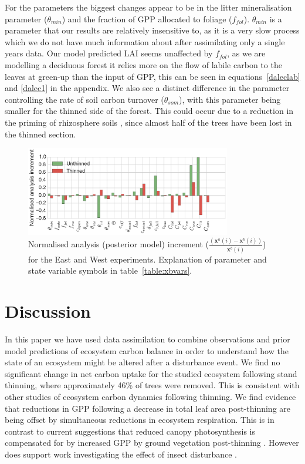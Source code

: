 \documentclass[draft,linenumbers]{agujournal}
\begin{document}
For the parameters the biggest changes appear to be in the litter mineralisation parameter (\(\theta_{min}\)) and the fraction of GPP allocated to foliage (\(f_{fol}\)). \(\theta_{min}\) is a parameter that our results are relatively insensitive to, as it is a very slow process which we do not have much information about after assimilating only a single years data. Our model predicted LAI seems unaffected by \(f_{fol}\), as we are modelling a deciduous forest it relies more on the flow of labile carbon to the leaves at green-up than the input of GPP, this can be seen in equations~\eqref{daleclab} and \eqref{dalec1} in the appendix. We also see a distinct difference in the parameter controlling the rate of soil carbon turnover (\(\theta_{som}\)), with this parameter being smaller for the thinned side of the forest. This could occur due to a reduction in the priming of rhizosphere soils \citep{ELE:ELE1095}, since almost half of the trees have been lost in the thinned section.


\begin{figure}[ht]
    \centering
    \includegraphics[width=0.8\textwidth]{xa_incc.pdf}
    \caption{Normalised analysis (posterior model) increment \big($\frac{(\textbf{x}^a(i) - \textbf{x}^b(i))}{\textbf{x}^b(i)}$\big) for the East and West experiments. Explanation of parameter and state variable symbols in table~\ref{table:xbvars}.}
    \label{fig:xa_inc}
\end{figure}

\section{Discussion}
In this paper we have used data assimilation to combine observations and prior model predictions of ecosystem carbon balance in order to understand how the state of an ecosystem might be altered after a disturbance event. We find no significant change in net carbon uptake for the studied ecosystem following stand thinning, where approximately 46\% of trees were removed. This is consistent with other studies of ecosystem carbon dynamics following thinning. We find evidence that reductions in GPP following a decrease in total leaf area post-thinning are being offset by simultaneous reductions in ecosystem respiration. This is in contrast to current suggestions that reduced canopy photosynthesis is compensated for by increased GPP by ground vegetation post-thinning \citep{vesala2005effect, wilkinson2015effects, moreaux2011paired, dore2012recovery}. However does support work investigating the effect of insect disturbance \citep{ELE:ELE12097}.
\end{document}
